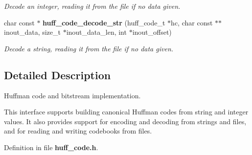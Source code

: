 \begin{CompactItemize}
\begin{CompactList}\small\item\em Decode an integer, reading it from the file if no data given. \item\end{CompactList}\item 
char const $\ast$ {\bf huff\_\-code\_\-decode\_\-str} (huff\_\-code\_\-t $\ast$hc, char const $\ast$$\ast$inout\_\-data, size\_\-t $\ast$inout\_\-data\_\-len, int $\ast$inout\_\-offset)\label{huff__code_8h_cd63ae1d68e8fb50c9bd7b7b6030badd}

\begin{CompactList}\small\item\em Decode a string, reading it from the file if no data given. \item\end{CompactList}\end{CompactItemize}


\subsection{Detailed Description}
Huffman code and bitstream implementation. 

This interface supports building canonical Huffman codes from string and integer values. It also provides support for encoding and decoding from strings and files, and for reading and writing codebooks from files. 

Definition in file {\bf huff\_\-code.h}.